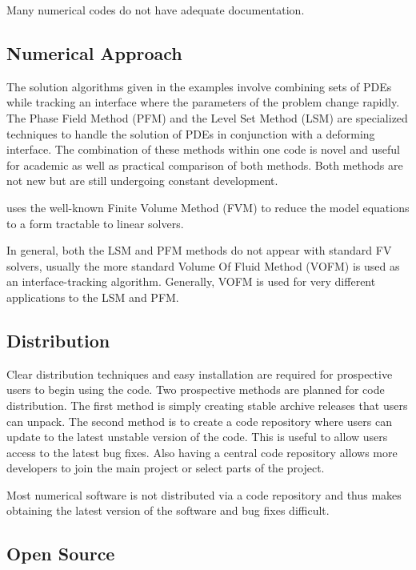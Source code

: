 Many numerical codes do not have adequate documentation.

\subsection{Numerical Approach}

The solution algorithms given in the \FiPy{} examples involve combining
sets of PDEs while tracking an interface where the parameters of the
problem change rapidly. The Phase Field Method (PFM) and the Level Set
Method (LSM) are specialized techniques to handle the solution of
PDEs in conjunction with a deforming interface. The combination of
these methods within one code is novel and useful for academic as well
as practical comparison of both methods. Both methods are not new but
are still undergoing constant development.

\FiPy{} uses the well-known Finite Volume Method (FVM) to reduce the
model equations to a form tractable to linear solvers.

In general, both the LSM and PFM methods do not appear with standard
FV solvers, usually the more standard Volume Of Fluid Method (VOFM) is
used as an interface-tracking algorithm. Generally, VOFM is used for
very different applications to the LSM and PFM.

\subsection{Distribution}

Clear distribution techniques and easy installation are required for
prospective users to begin using the code. Two prospective methods are
planned for code distribution. The first method is simply creating
stable archive releases that users can unpack. The second method is to
create a code repository where users can update to the latest unstable
version of the code. This is useful to allow users access to the
latest bug fixes. Also having a central code repository allows more
developers to join the main project or select parts of the project.

Most numerical software is not distributed via a code repository and
thus makes obtaining the latest version of the software and bug fixes
difficult.

\subsection{Open Source}


